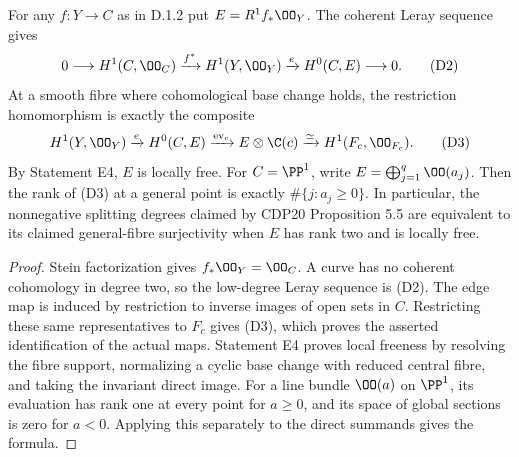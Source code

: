 \begin{proposition}[D.1.4; Proved]\label{st:D.1.4}
For any $f:Y\to C$ as in D.1.2 put $E=R^1f_*\OO_Y$.
The coherent Leray sequence gives
\[
0\longrightarrow H^1(C,\OO_C)\xrightarrow{f^*}H^1(Y,\OO_Y)
\xrightarrow{e}H^0(C,E)\longrightarrow0.               \tag{D2}
\]
At a smooth fibre where cohomological base change holds, the
restriction homomorphism is exactly the composite
\[
H^1(Y,\OO_Y)\xrightarrow{e}H^0(C,E)
\xrightarrow{\operatorname{ev}_c}E\otimes\C(c)
\xrightarrow{\simeq}H^1(F_c,\OO_{F_c}).               \tag{D3}
\]
By Statement E4, $E$ is locally free. For $C=\PP^1$, write
$E=\bigoplus_{j=1}^q\OO(a_j)$.
Then the rank of (D3) at a general point is exactly
$\#\{j:a_j\geq0\}$. In particular, the nonnegative splitting
degrees claimed by CDP20 Proposition 5.5 are equivalent to its
claimed general-fibre surjectivity when $E$ has rank two and is
locally free.
\end{proposition}
\begin{proof}
Stein factorization gives $f_*\OO_Y=\OO_C$. A curve has no coherent
cohomology in degree two, so the low-degree Leray sequence is (D2).
The edge map is induced by restriction to inverse images of open
sets in $C$. Restricting these same representatives to $F_c$ gives
(D3), which proves the asserted identification of the actual maps.
Statement E4 proves local freeness by resolving the fibre support,
normalizing a cyclic base change with reduced central fibre, and
taking the invariant direct image. For a line bundle
$\OO(a)$ on $\PP^1$, its evaluation has rank one at every point
for $a\geq0$, and its space of global sections is zero for $a<0$.
Applying this separately to the direct summands gives the formula.
\end{proof}

